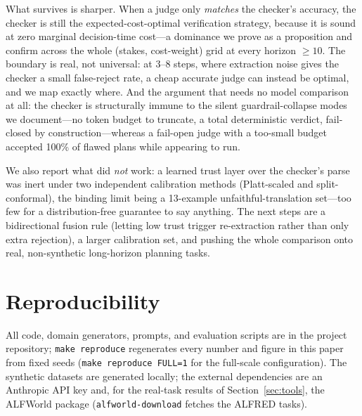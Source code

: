 \documentclass[letterpaper]{article}
\begin{document}
What survives is sharper. When a judge only \emph{matches} the checker's
accuracy, the checker is still the expected-cost-optimal verification
strategy, because it is sound at zero marginal decision-time cost---a
dominance we prove as a proposition and confirm across the whole
(stakes, cost-weight) grid at every horizon $\ge 10$. The boundary is real,
not universal: at 3--8 steps, where extraction noise gives the checker a
small false-reject rate, a cheap accurate judge can instead be optimal, and
we map exactly where. And the argument that needs no model comparison at
all: the checker is structurally immune to the silent guardrail-collapse
modes we document---no token budget to truncate, a total deterministic
verdict, fail-closed by construction---whereas a fail-open judge with a
too-small budget accepted 100\% of flawed plans while appearing to run.

We also report what did \emph{not} work: a learned trust layer over the
checker's parse was inert under two independent calibration methods
(Platt-scaled and split-conformal), the binding limit being a
13-example unfaithful-translation set---too few for a distribution-free
guarantee to say anything. The next steps are a bidirectional fusion rule
(letting low trust trigger re-extraction rather than only extra rejection),
a larger calibration set, and pushing the whole comparison onto real,
non-synthetic long-horizon planning tasks.

\section*{Reproducibility}

All code, domain generators, prompts, and evaluation scripts are in the
project repository; \texttt{make reproduce} regenerates every number and
figure in this paper from fixed seeds (\texttt{make reproduce FULL=1} for
the full-scale configuration). The synthetic datasets are generated locally;
the external dependencies are an Anthropic API key and, for the real-task
results of Section~\ref{sec:tools}, the ALFWorld package
(\texttt{alfworld-download} fetches the ALFRED tasks).


\end{document}
